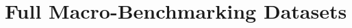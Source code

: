\documentclass[
  12pt]{findlay}
\begin{document}
\FloatBarrier

\clearpage

\hypertarget{full-macro-benchmarking-datasets}{%
\section{Full Macro-Benchmarking
Datasets}\label{full-macro-benchmarking-datasets}}

\label{appendix_datasets}

\begingroup
\let\tablesize\scriptsize



\endgroup
\end{document}
